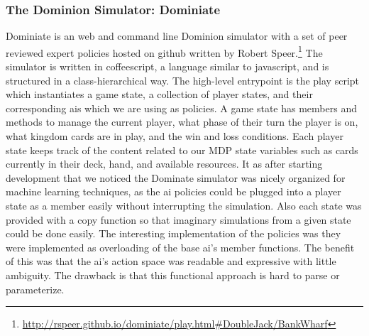 \documentclass{article}
\begin{document}
\subsubsection{The Dominion Simulator: Dominiate}
Dominiate is an web and command line Dominion simulator with a set of peer reviewed expert policies hosted on github written by Robert Speer.\footnote{\url{http://rspeer.github.io/dominiate/play.html#DoubleJack/BankWharf}} The simulator is written in coffeescript, a language similar to javascript, and is structured in a class-hierarchical way. The high-level entrypoint is the play script which instantiates a game state, a collection of player states, and their corresponding ais which we are using as policies. A game state has members and methods to manage the current player, what phase of their turn the player is on, what kingdom cards are in play, and the win and loss conditions. Each player state keeps track of the content related to our MDP state variables such as cards currently in their deck, hand, and available resources. It as after starting development that we noticed the Dominate simulator was nicely organized for machine learning techniques, as the ai policies could be plugged into a player state as a member easily without interrupting the simulation. Also each state was provided with a copy function so that imaginary simulations from a given state could be done easily. The interesting implementation of the policies was they were implemented as overloading of the base ai’s member functions. The benefit of this was that the ai’s action space was readable and expressive with little ambiguity. The drawback is that this functional approach is hard to parse or parameterize.
\end{document}
